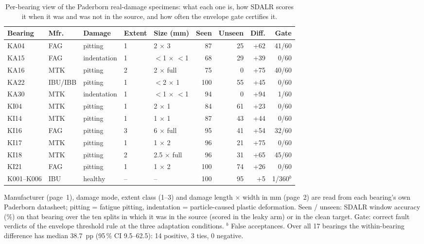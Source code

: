 \begin{table}[htbp]
\centering
\caption{Per-bearing view of the Paderborn real-damage specimens: what each one is, how SDALR scores it when it was and was not in the source, and how often the envelope gate certifies it.}
\label{tab:bearings}
\small
\setlength{\tabcolsep}{4pt}
\begin{tabular}{lllllrrrr}
\toprule
Bearing & Mfr. & Damage & Extent & Size (mm) & Seen & Unseen & Diff. & Gate \\
\midrule
KA04 & FAG & pitting & 1 & 2 $\times$ 3 & 87 & 25 & +62 & 41/60 \\
KA15 & FAG & indentation & 1 & $<$1 $\times$ $<$1 & 68 & 29 & +39 & 0/60 \\
KA16 & MTK & pitting & 2 & 2 $\times$ full & 75 & 0 & +75 & 40/60 \\
KA22 & IBU/IBB & pitting & 1 & $<$2 $\times$ 1 & 100 & 55 & +45 & 0/60 \\
KA30 & MTK & indentation & 1 & $<$1 $\times$ $<$1 & 94 & 0 & +94 & 1/60 \\
KI04 & MTK & pitting & 1 & 2 $\times$ 1 & 84 & 61 & +23 & 0/60 \\
KI14 & MTK & pitting & 1 & 1 $\times$ 1 & 87 & 43 & +44 & 0/60 \\
KI16 & FAG & pitting & 3 & 6 $\times$ full & 95 & 41 & +54 & 32/60 \\
KI17 & MTK & pitting & 1 & 1 $\times$ 2 & 96 & 21 & +75 & 0/60 \\
KI18 & MTK & pitting & 2 & 2.5 $\times$ full & 96 & 31 & +65 & 45/60 \\
KI21 & FAG & pitting & 1 & 1 $\times$ 2 & 100 & 74 & +26 & 0/60 \\
\midrule
K001--K006 & IBU & healthy & -- & -- & 100 & 95 & +5 & 1/360$^{b}$ \\
\bottomrule
\end{tabular}
\begin{minipage}{\linewidth}\vspace{2pt}\footnotesize Manufacturer (page~1), damage mode, extent class (1--3) and damage length $\times$ width in mm (page~2) are read from each bearing's own Paderborn datasheet; pitting = fatigue pitting, indentation = particle-caused plastic deformation. Seen / unseen: SDALR window accuracy (\%) on that bearing over the ten splits in which it was in the source (scored in the leaky arm) or in the clean target. Gate: correct fault verdicts of the envelope threshold rule at the three adaptation conditions. $^{b}$ False acceptances. Over all 17 bearings the within-bearing difference has median 38.7~pp (95\,\% CI 9.5--62.5): 14 positive, 3 ties, 0 negative.\end{minipage}
\end{table}
